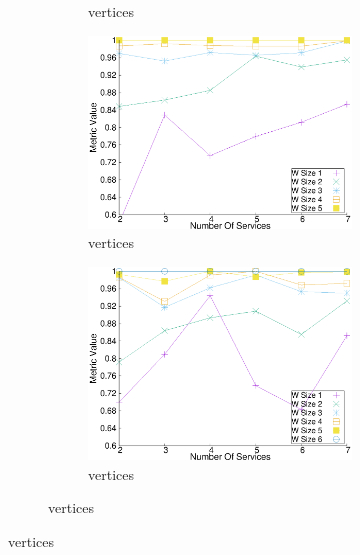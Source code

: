 \begin{figure}[H]
\begin{adjustbox}{minipage=\linewidth,scale=0.75}
\begin{subfigure}{0.45\textwidth}
\begin{subfigure}{\textwidth}
      \caption{ vertices}
      \label{fig:quality_window_wide_perce_n4}
    \end{subfigure}
    \begin{subfigure}{\textwidth}
      \includegraphics[width=\textwidth]{Images/graphs/window_quality_performance_diff_perce_n7_s7_20_100_n5}
      \caption{ vertices}
  
      \label{fig:quality_window_wide_perce_n5}
    \end{subfigure}
  
      \begin{subfigure}{\textwidth}
      \includegraphics[width=\textwidth]{Images/graphs/window_quality_performance_diff_perce_n7_s7_20_100_n6}
      \caption{ vertices}
      \label{fig:quality_window_wide_perce_n6}
    \end{subfigure}
  

\end{subfigure}
\end{adjustbox}
\end{figure}

